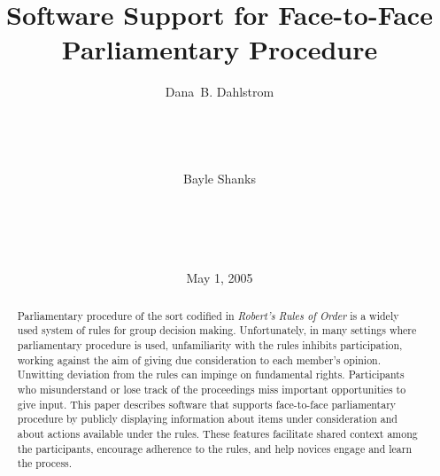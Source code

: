 \documentclass{acm_proc_article-sp}
\begin{document}

\title{Software Support for Face-to-Face Parliamentary Procedure}

\author{
\alignauthor Dana~B. Dahlstrom\\
       \\
       \\
       \\ 
       \\
\alignauthor Bayle Shanks\\
       \\
       \\
       \\
       \\
}

\date{May 1, 2005}

\maketitle

\begin{abstract}
Parliamentary procedure of the sort codified in \emph{Robert's Rules of Order}
is a widely used system of rules for group decision making.
Unfortunately, in many settings where parliamentary procedure is used,
unfamiliarity with the rules inhibits participation,
working against the aim of giving due consideration to each member's opinion.
Unwitting deviation from the rules can impinge on fundamental rights.
Participants who misunderstand or lose track of the proceedings
miss important opportunities to give input.
This paper describes software that
supports face-to-face parliamentary procedure
by publicly displaying information about items under consideration
and about actions available under the rules.
These features facilitate shared context among the participants,
encourage adherence to the rules, and
help novices engage and learn the process.
\end{abstract}
\end{document}
